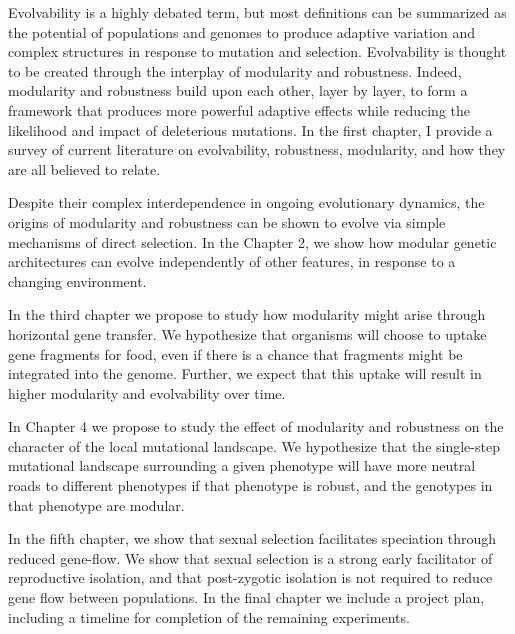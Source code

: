 Evolvability is a highly debated term, but most definitions can be summarized as the potential of populations and genomes to produce adaptive variation and complex structures in response to mutation and selection. Evolvability is thought to be created through the interplay of modularity and robustness. Indeed, modularity and robustness build upon each other, layer by layer, to form a framework that produces more powerful adaptive effects while reducing the likelihood and impact of deleterious mutations. In the first chapter, I provide a survey of current literature on evolvability, robustness, modularity, and how they are all believed to relate.

Despite their complex interdependence in ongoing evolutionary dynamics, the origins of modularity and robustness can be shown to evolve via simple mechanisms of direct selection. In the Chapter 2, we show how modular genetic architectures can evolve independently of other features, in response to a changing environment.

In the third chapter we propose to study how modularity might arise through horizontal gene transfer.  We hypothesize that organisms will choose to uptake gene fragments for food, even if there is a chance that fragments might be integrated into the genome.  Further, we expect that this uptake will result in higher modularity and evolvability over time.

In Chapter 4 we propose to study the effect of modularity and robustness on the character of the local mutational landscape.  We hypothesize that the single-step mutational landscape surrounding a given phenotype will have more neutral roads to different phenotypes if that phenotype is robust, and the genotypes in that phenotype are modular.

In the fifth chapter, we show that sexual selection facilitates speciation through reduced gene-flow.  We show that sexual selection is a strong early facilitator of reproductive isolation, and that post-zygotic isolation is not required to reduce gene flow between populations.
In the final chapter we include a project plan, including a timeline for completion of the remaining experiments.